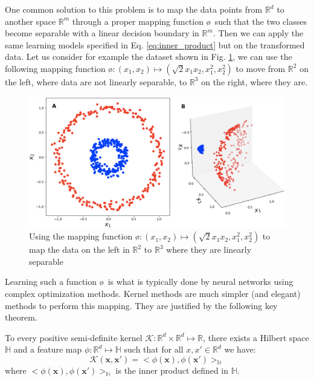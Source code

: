 One common solution to this problem is to map the data points from $\mathbb{R}^d$ to another space $\mathbb{R}^m$  through a proper mapping function \o~such   that the two classes become separable with a linear decision boundary in $\mathbb{R}^m$. Then we can apply the same learning models specified in Eq. \ref{eq:inner_product} but on the transformed data. Let us consider for example the dataset shown in Fig. \ref{fig:polynomial_kernel},  we can use the following mapping function \o$:(x_1,x_2)\mapsto (\sqrt{2}x_1x_2,x_1^2,x_2^2)$ to move from $\mathbb{R}^2$ on the left, where data are not linearly separable, to $\mathbb{R}^3$ on the right, where they are.
\begin{figure}[H]
\centering
\includegraphics[scale=0.25]{figs/poly_kenrnel.png}
\caption[Lifting data to a higher-dimension space to get linearly separable classes]{ Using the mapping function \o$:(x_1,x_2)\mapsto (\sqrt{2}x_1x_2,x_1^2,x_2^2)$ to map the data on the left in $\mathbb{R}^2$ to $\mathbb{R}^3$ where they are linearly separable}
\label{fig:polynomial_kernel}
\end{figure}
Learning such a function \o~is what is typically done by neural networks using complex optimization methods.  Kernel methods are much simpler (and elegant) methods to perform this mapping. They are justified by the following key theorem.
\begin{theorem}
To every positive semi-definite kernel $\mathcal{K}:\mathbb{R}^d\times \mathbb{R}^d\mapsto \mathbb{R}$, there exists a Hilbert space $\mathbb{H}$ and a feature map $\phi:\mathbb{R}^d\mapsto\mathbb{H}$ such that for all $x,x'\in\mathbb{R}^d$ we have: 
\begin{equation}
\label{eq:kernel_main_equation}
    \mathcal{K}(\mathbf{x},\mathbf{x}')=<\phi(\mathbf{x}),\phi(\mathbf{x}')>_\mathbb{H}
\end{equation}
where $<\phi(\mathbf{x}),\phi(\mathbf{x}')>_\mathbb{H}$ is the inner product defined in $\mathbb{H}$.
\end{theorem}
